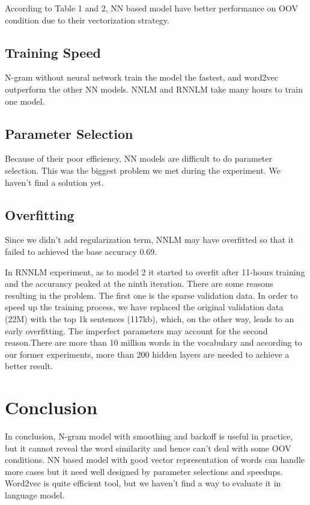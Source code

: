 \documentclass[11pt, oneside]{article}   	%
\begin{document}
According to Table 1 and 2, NN based model have better performance on OOV condition due to their vectorization strategy. 
\subsection{Training Speed}
N-gram without neural network train the model the fastest, and word2vec outperform the other NN models. NNLM and RNNLM take many hours to train one model. 
\subsection{Parameter Selection}
Because of their poor efficiency, NN models are difficult to do parameter selection. This was the biggest problem we met during the experiment. We haven't find a solution yet.
\subsection{Overfitting}
Since we didn't add regularization term, NNLM may have overfitted so that it failed to achieved the base accuracy 0.69.

In RNNLM experiment, as to model 2 it started to overfit after 11-hours training and the accurancy peaked at the ninth iteration. There are some reasons resulting in the problem. The first one is the sparse validation data. In order to speed up the training process, we have replaced the original validation data (22M) with the top 1k sentences (117kb), which, on the other way, leads to an early overfitting. The imperfect parameters may account for the second reason.There are more than 10 million words in the vocabulary and according to our former experiments, more than 200 hidden layers are needed to achieve a better result.

\section{Conclusion}
In conclusion, N-gram model with smoothing and backoff is useful in practice, but it cannot reveal the word similarity and hence can't deal with some OOV conditions. 
NN based model with good vector representation of words can handle more cases but it need well designed by parameter selections and speedups. Word2vec is quite efficient tool, but we haven't find a way to evaluate it in language model.
\end{document}
